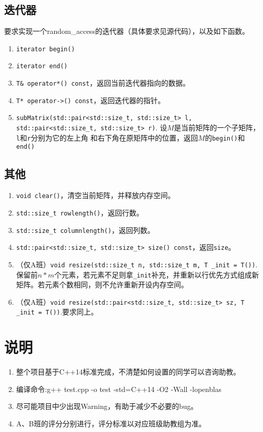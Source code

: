 \documentclass[12pt, a4paper]{article}
\newcommand{\ilc}{\texttt}
\begin{document}
\subsection{迭代器}
  要求实现一个random\_access的迭代器（具体要求见源代码），以及如下函数。
  \begin{enumerate}
    \item \ilc{iterator begin()}
    \item \ilc{iterator end()}
    \item \ilc{T\& operator*() const}，返回当前迭代器指向的数据。
    \item \ilc{T* operator->() const}，返回迭代器的指针。
    \item \ilc{subMatrix(std::pair<std::size\_t, std::size\_t> l,
              std::pair<std::size\_t, std::size\_t> r)}.
    设$M$是当前矩阵的一个子矩阵，\ilc{l}和\ilc{r}分别为它的左上角
    和右下角在原矩阵中的位置，返回$M$的\ilc{begin()}和\ilc{end()}
  \end{enumerate}

\subsection{其他}
  \begin{enumerate}
    \item \ilc{void clear()}，清空当前矩阵，并释放内存空间。
    \item \ilc{std::size\_t rowlength()}，返回行数。
    \item \ilc{std::size\_t columnlength()}，返回列数。
    \item \ilc{std::pair<std::size\_t, std::size\_t> size() const}，返回\ilc{size}。
    \item （仅A班）\ilc{void resize(std::size\_t n, std::size\_t m, T \_init = T())}.保留前$n*m$个元素，若元素不足则拿\ilc{\_init}补充，并重新以行优先方式组成新矩阵。若元素个数相同，则不允许重新开设内存空间。
    \item （仅A班）\ilc{void resize(std::pair<std::size\_t, std::size\_t> sz, T \_init = T())}.要求同上。
  \end{enumerate}

\section{说明}
  \begin{enumerate}
  	\item 整个项目基于C++14标准完成，不清楚如何设置的同学可以咨询助教。
  	\item 编译命令:g++ test.cpp -o test -std=C++14 -O2 -Wall -lopenblas
  	\item 尽可能项目中少出现Warning，有助于减少不必要的bug。
  	\item A、B班的评分分别进行，评分标准以对应班级助教组为准。
  \end{enumerate}
\end{document}
